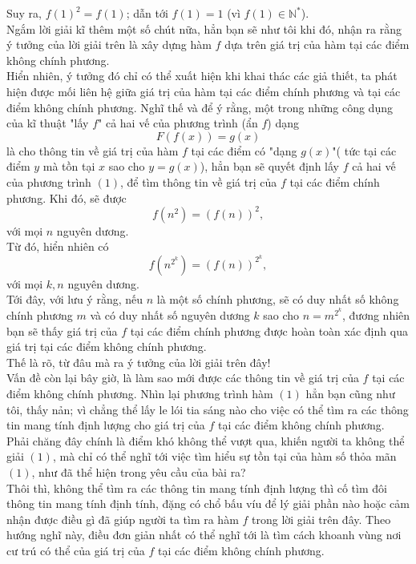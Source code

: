 Suy ra, $f\left(1\right)^2=f\left(1\right)$; dẫn tới $f(1)=1$ (vì $f\left(1\right)\in\mathbb{N}^*$).\\
Ngắm lời giải kĩ thêm một số chút nữa, hẳn bạn sẽ như tôi khi đó, nhận ra rằng ý tưởng của lời giải trên là xây dựng hàm $f$ dựa trên giá trị của hàm tại các điểm không chính phương.\\
Hiển nhiên, ý tưởng đó chỉ có thể xuất hiện khi khai thác các giả thiết, ta phát hiện được mối liên hệ giữa giá trị của hàm tại các điểm chính phương và tại các điểm không chính phương. Nghĩ thế và để ý rằng, một trong những công dụng của kĩ thuật "lấy $f$" cả hai vế của phương trình (ẩn $f$) dạng $$F\left(f\left(x\right)\right)=g(x)$$
là cho thông tin về giá trị của hàm $f$ tại các điểm có "dạng $g(x)$"( tức tại các điểm $y$ mà tồn tại $x$ sao cho $y=g(x)$), hẳn bạn sẽ quyết định lấy $f$ cả hai vế của phương trình $(1)$, để tìm thông tin về giá trị của $f$ tại các điểm chính phương. Khi đó, sẽ được $$f\left(n^2\right)=\left(f\left(n\right)\right)^2,$$
với mọi $n$ nguyên dương.\\
Từ đó, hiển nhiên có \[f\left(n^{2^k}\right)=\left(f\left(n\right)\right)^{2^k},\tag{2}\]
với mọi $k,n$ nguyên dương.\\
Tới đây, với lưu ý rằng, nếu $n$ là một số chính phương, sẽ có duy nhất số không chính phương $m$ và có duy nhất số nguyên dương $k$ sao cho $n=m^{2^k}$, đương nhiên bạn sẽ thấy giá trị của $f$ tại các điểm chính phương được hoàn toàn xác định qua giá trị tại các điểm không chính phương.\\
Thế là rõ, từ đâu mà ra ý tưởng của lời giải trên đây!\\
Vấn đề còn lại bây giờ, là làm sao mới được các thông tin về giá trị của $f$ tại các điểm không chính phương. Nhìn lại phương trình hàm $(1)$ hẳn bạn cũng như tôi, thấy nản; vì chẳng thể lấy le lói tia sáng nào cho việc có thể tìm ra các thông tin mang tính định lượng cho giá trị của $f$ tại các điểm không chính phương. Phải chăng đây chính là điểm khó không thể vượt qua, khiến người ta không thể giải $(1)$, mà chỉ có thể nghĩ tới việc tìm hiểu sự tồn tại của hàm số thỏa mãn $(1)$, như đã thể hiện trong yêu cầu của bài ra?\\
Thôi thì, không thể tìm ra các thông tin mang tính định lượng thì cố tìm đôi thông tin mang tính định tính, đặng có chổ bấu víu để lý giải phần nào hoặc cảm nhận được điều gì đã giúp người ta tìm ra hàm $f$ trong lời giải trên đây. Theo hướng nghĩ này, điều đơn giản nhất có thể nghĩ tới là tìm cách khoanh vùng nơi cư trú có thể của giá trị của $f$ tại các điểm không chính phương.\\
